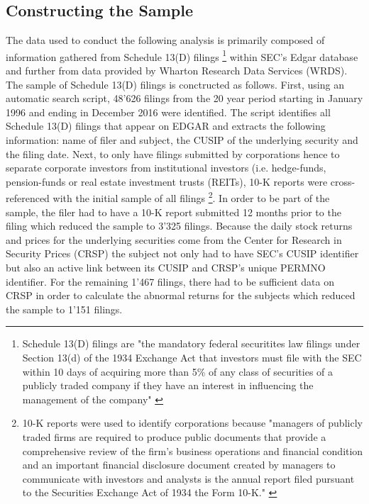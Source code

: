 \documentclass[12pt]{article}
\begin{document}
\subsection{Constructing the Sample}
The data used to conduct the following analysis is primarily composed of information gathered from Schedule 13(D) filings 
	\footnote{Schedule 13(D) filings are "the mandatory federal securitites law filings under Section 13(d) of the 1934 Exchange Act that investors must file with the SEC within 10 days of acquiring more than 5\% of any class of securities of a publicly traded company if they have an interest in influencing the management of the company" \citep[p. 1736]{Brav2008}} 
within SEC's Edgar database and further from data provided by Wharton Research Data Services (WRDS). The sample of Schedule 13(D) filings is conctructed as follows. First, using an automatic search script, 48'626 filings from the 20 year period starting in January 1996 and ending in December 2016 were identified.  The script identifies all Schedule 13(D) filings that appear on EDGAR and extracts the following information: name of filer and subject, the CUSIP of the underlying security and the filing date. Next, to only have filings submitted by corporations hence to separate corporate investors from institutional investors (i.e. hedge-funds, pension-funds or real estate investment trusts (REITs), 10-K reports were cross-referenced with the initial sample of all filings
	\footnote{10-K reports were used to identify corporations because "managers of publicly traded firms are required to produce public documents that provide a comprehensive review of the firm’s business operations and financial condition and an important financial disclosure document created by managers to communicate with investors and analysts is the annual report filed pursuant to the Securities Exchange Act of 1934 the Form 10-K." \citep[p. 1643]{Loughran2014}}. 
In order to be part of the sample, the filer had to have a 10-K report submitted 12 months prior to the filing which reduced the sample to 3'325 filings. Because the daily stock returns and prices for the underlying securities come from the Center for Research in Security Prices (CRSP) the subject not only had to have SEC's CUSIP identifier but also an active link between its CUSIP and CRSP's unique PERMNO identifier. For the remaining 1'467 filings, there had to be sufficient data on CRSP in order to calculate the abnormal returns for the subjects which reduced the sample to 1'151 filings. 
\end{document}
